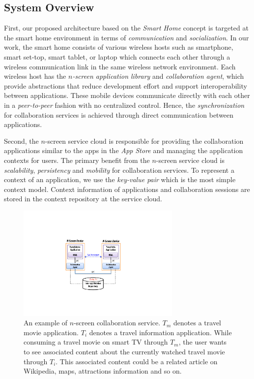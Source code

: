 \documentclass[conference]{IEEEtran}
\begin{document}
\subsection{System Overview}
First, our proposed architecture based on the \textit{Smart Home} concept is targeted at the smart home environment in terms of \textit{communication} and \textit{socialization}. 
In our work, the smart home consists of various wireless hosts such as smartphone, smart set-top, smart tablet, or laptop which connects each other through a wireless communication link in the same wireless network environment. Each wireless host has the \textit{$n$-screen application library} and \textit{collaboration agent}, which provide abstractions that reduce development effort and support interoperability between applications. These mobile devices communicate directly with each other in a \textit{peer-to-peer} fashion with no centralized control.  Hence, the \textit{synchronization} for collaboration services is achieved through direct communication between applications.

Second,  the $n$-screen service cloud is responsible for providing the collaboration applications similar to the apps in the \textit{App Store} and managing the application contexts  for users. 
The primary benefit from the $n$-screen service cloud is \textit{scalability}, \textit{persistency} and \textit{mobility} for collaboration services. 
To represent a context of an application, we use the \textit{key-value pair} which is the most simple context model. Context information of applications and collaboration sessions are stored in the context repository at the service cloud.

\begin{figure}[htb] %
\centering
\includegraphics[width=8cm,keepaspectratio]{basicmodel}
\caption{An example of $n$-screen collaboration service.  $T_m$ denotes a travel movie application. $T_i$ denotes a travel information application. While consuming a travel movie on smart TV through $T_m$, the user wants to see associated content about the currently watched travel movie through $T_i$. This associated content could be a related article on Wikipedia, maps, attractions information and so on.}
\label{fig:basicmodel}
\end{figure}
\end{document}
